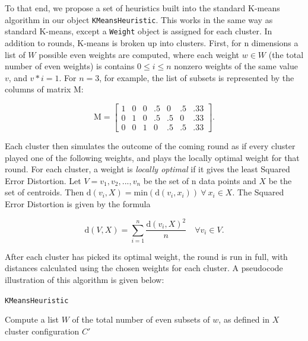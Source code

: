 \documentclass[12pt,twocolumn,titlepage]{article}
\begin{document}
To that end, we propose a set of heuristics built into the standard K-means algorithm in our object \texttt{KMeansHeuristic}. This works in the same way as standard K-means, except a \texttt{Weight} object is assigned for each cluster. In addition to rounds, K-means is broken up into clusters. First, for n dimensions a list of $W$ possible even weights are computed, where each weight $w \in W$ (the total number of even weights) is contains $0 \leq i \leq n$ nonzero weights of the same value $v$, and $v*i = 1$. For $n = 3$, for example, the list of subsets 
is represented by the columns of matrix $\mathrm{M}$:

\begin{equation}\label{}
\mathrm{M} = \begin{bmatrix}
1 & 0 & 0 & .5 & 0 & .5 & .33 \\
0 & 1 & 0 & .5 & .5 & 0 & .33 \\
0 & 0 & 1 & 0 & .5 & .5 & .33
\end{bmatrix}.
\end{equation}

Each cluster then simulates the outcome of the coming round as if every cluster played one of the following weights, and plays the locally optimal weight for that round. For each cluster, a weight is \emph{locally optimal} if it gives the least Squared Error Distortion. Let $V = {v_1,v_2,...,v_n}$ be the set of n data points and $X$ be the set of centroids. Then $\mathrm{d}(v_i, X) = \mathrm{min}(\mathrm{d}(v_i, x_i))\: \forall \: x_i \in X$. The Squared Error Distortion is given by the formula 

\begin{equation}\label{}
\mathrm{d}(V,X) = \sum_{i=1}^{n} \frac{\mathrm{d}(v_i, X)^2}{n} \quad \forall v_i \in V.
\end{equation}

After each cluster has picked its optimal weight, the round is run in full, with distances calculated using the chosen weights for each cluster. A pseudocode illustration of this algorithm is given below:

\begin{algorithm}
 \caption{\texttt{KMeansHeuristic}}\label{algoCPOR2}
 Compute a list $W$ of the total number of even subsets of $w$, as defined in $X$\;
 \KwRet cluster configuration $C'$\;
\end{algorithm}
\end{document}
